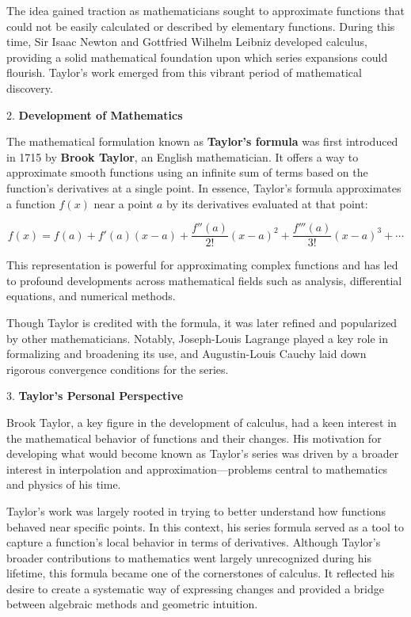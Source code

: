\documentclass[a4paper,12pt]{book}
\begin{document}
The idea gained traction as mathematicians sought to approximate functions that could not be easily calculated or described by elementary functions. During this time, Sir Isaac Newton and Gottfried Wilhelm Leibniz developed calculus, providing a solid mathematical foundation upon which series expansions could flourish. Taylor's work emerged from this vibrant period of mathematical discovery.

2. \textbf{Development of Mathematics}

The mathematical formulation known as \textbf{Taylor's formula} was first introduced in 1715 by \textbf{Brook Taylor}, an English mathematician. It offers a way to approximate smooth functions using an infinite sum of terms based on the function’s derivatives at a single point. In essence, Taylor's formula approximates a function \( f(x) \) near a point \( a \) by its derivatives evaluated at that point:

\[
f(x) = f(a) + f'(a)(x - a) + \frac{f''(a)}{2!}(x - a)^2 + \frac{f'''(a)}{3!}(x - a)^3 + \cdots
\]

This representation is powerful for approximating complex functions and has led to profound developments across mathematical fields such as analysis, differential equations, and numerical methods.

Though Taylor is credited with the formula, it was later refined and popularized by other mathematicians. Notably, Joseph-Louis Lagrange played a key role in formalizing and broadening its use, and Augustin-Louis Cauchy laid down rigorous convergence conditions for the series.

3. \textbf{Taylor's Personal Perspective}

Brook Taylor, a key figure in the development of calculus, had a keen interest in the mathematical behavior of functions and their changes. His motivation for developing what would become known as Taylor's series was driven by a broader interest in interpolation and approximation—problems central to mathematics and physics of his time. 

Taylor’s work was largely rooted in trying to better understand how functions behaved near specific points. In this context, his series formula served as a tool to capture a function's local behavior in terms of derivatives. Although Taylor’s broader contributions to mathematics went largely unrecognized during his lifetime, this formula became one of the cornerstones of calculus. It reflected his desire to create a systematic way of expressing changes and provided a bridge between algebraic methods and geometric intuition.
\end{document}
